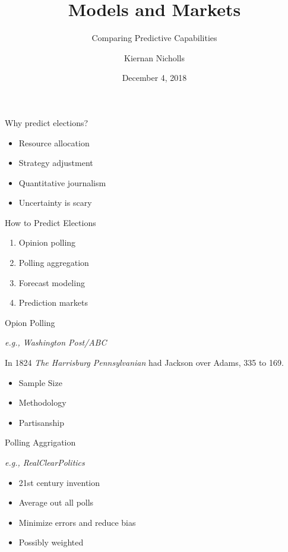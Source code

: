 \documentclass[ignorenonframetext,]{beamer}
\title{Models and Markets}
\subtitle{Comparing Predictive Capabilities}
\author{Kiernan Nicholls}
\date{December 4, 2018}
\providecommand{\tightlist}{%
  \setlength{\itemsep}{0pt}\setlength{\parskip}{0pt}}
\begin{document}
\frame{\titlepage}

\begin{frame}{Why predict elections?}

\begin{itemize}
\tightlist
\item
  Resource allocation
\item
  Strategy adjustment
\item
  Quantitative journalism
\item
  Uncertainty is scary
\end{itemize}

\end{frame}

\begin{frame}{How to Predict Elections}

\begin{enumerate}
\def\labelenumi{\arabic{enumi}.}
\tightlist
\item
  Opinion polling
\item
  Polling aggregation
\item
  Forecast modeling
\item
  Prediction markets
\end{enumerate}

\end{frame}

\begin{frame}{Opion Polling}

\emph{e.g., Washington Post/ABC}

In 1824 \emph{The Harrisburg Pennsylvanian} had Jackson over Adams, 335
to 169.

\begin{itemize}
\tightlist
\item
  Sample Size
\item
  Methodology
\item
  Partisanship
\end{itemize}

\end{frame}

\begin{frame}{Polling Aggrigation}

\emph{e.g., RealClearPolitics}

\begin{itemize}
\tightlist
\item
  21st century invention
\item
  Average out all polls
\item
  Minimize errors and reduce bias
\item
  Possibly weighted
\end{itemize}

\end{frame}
\end{document}
